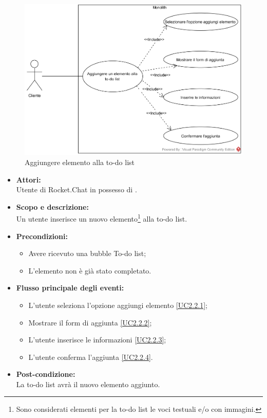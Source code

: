 
\begin{figure}[H]
	\centering
	\includegraphics[width=15cm]{../../documenti/AnalisiDeiRequisiti/Diagrammi_img/uc2_2.png}
	\caption{\UCCaption{} Aggiungere elemento alla to-do list}
\end{figure}

\begin{itemize}
	\item \textbf{Attori:}
	\\Utente di Rocket.Chat in possesso di \ProjectName{}.
	\item \textbf{Scopo e descrizione:} 
	\\Un utente inserisce un nuovo elemento\footnote{Sono considerati elementi per la to-do list le voci testuali e/o con immagini.} alla to-do list.
	\item \textbf{Precondizioni:}
	\begin{itemize}
		\item Avere ricevuto una bubble To-do list;
		\item L'elemento non è già stato completato.
	\end{itemize}
	\item \textbf{Flusso principale degli eventi:}
	\begin{itemize}
		\item L'utente seleziona l'opzione aggiungi elemento \ref{UC2.2.1};
		\item Mostrare il form di aggiunta \ref{UC2.2.2};
		\item L'utente inserisce le informazioni \ref{UC2.2.3};
		\item L'utente conferma l'aggiunta \ref{UC2.2.4}.
	\end{itemize}
	\item \textbf{Post-condizione:}
	\\La to-do list avrà il nuovo elemento aggiunto.
\end{itemize}

